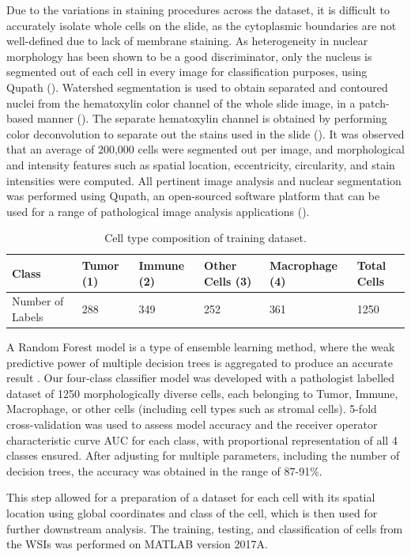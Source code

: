 \documentclass[
]{book}
\begin{document}
Due to the variations in staining procedures across the dataset, it is difficult to accurately isolate whole cells on the slide, as the cytoplasmic boundaries are not well-defined due to lack of membrane staining. As heterogeneity in nuclear morphology has been shown to be a good discriminator, only the nucleus is segmented out of each cell in every image for classification purposes, using Qupath (\citet{Yuan12}). Watershed segmentation is used to obtain separated and contoured nuclei from the hematoxylin color channel of the whole slide image, in a patch-based manner (\citet{Bankhead18}). The separate hematoxylin channel is obtained by performing color deconvolution to separate out the stains used in the slide (\citet{Ruifrok01}). It was observed that an average of 200,000 cells were segmented out per image, and morphological and intensity features such as spatial location, eccentricity, circularity, and stain intensities were computed. All pertinent image analysis and nuclear segmentation was performed using Qupath, an open-sourced software platform that can be used for a range of pathological image analysis applications (\citet{Bankhead17}).

\begin{table}

\caption{\label{tab:wsi}Cell type composition of training dataset.}
\centering
\begin{tabular}[t]{l|l|l|l|l|l}
\hline
Class & Tumor (1) & Immune (2) & Other Cells (3) & Macrophage (4) & Total Cells\\
\hline
Number of Labels & 288 & 349 & 252 & 361 & 1250\\
\hline
\end{tabular}
\end{table}

A Random Forest model is a type of ensemble learning method, where the weak predictive power of multiple decision trees is aggregated to produce an accurate result \citet{Breiman01}. Our four-class classifier model was developed with a pathologist labelled dataset of 1250 morphologically diverse cells, each belonging to Tumor, Immune, Macrophage, or other cells (including cell types such as stromal cells). 5-fold cross-validation was used to assess model accuracy and the receiver operator characteristic curve AUC for each class, with proportional representation of all 4 classes ensured. After adjusting for multiple parameters, including the number of decision trees, the accuracy was obtained in the range of 87-91\%.

This step allowed for a preparation of a dataset for each cell with its spatial location using global coordinates and class of the cell, which is then used for further downstream analysis. The training, testing, and classification of cells from the WSIs was performed on MATLAB version 2017A.
\end{document}
